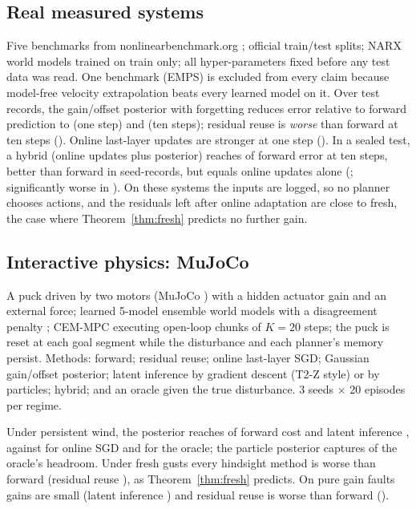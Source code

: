 \documentclass[11pt]{article}
\begin{document}
\subsection{Real measured systems}
Five benchmarks from nonlinearbenchmark.org \citep{nonlinear_benchmarks}; official train/test splits; NARX world models
trained on train only; all hyper-parameters fixed before any test data was read. One benchmark (EMPS) is excluded from
every claim because model-free velocity extrapolation beats every learned model on it. Over \rdRecords{} test records,
the gain/offset posterior with forgetting reduces error relative to forward prediction to \rdOneStep{} (one step) and
\rdTenStep{} (ten steps); residual reuse is \emph{worse} than forward at ten steps (\rdResidTen). Online last-layer
updates \citep{adajepa_2606_32026} are stronger at one step (\rdSgdOne). In a sealed test, a hybrid (online updates plus
posterior) reaches \rdHybridFwd{} of forward error at ten steps, better than forward in \rdHybridSigFwd{} seed-records, but
equals online updates alone (\rdHybridSgd; significantly worse in \rdHybridWorseSgd). On these systems the inputs are
logged, so no planner chooses actions, and the residuals left after online adaptation are close to fresh, the case where
Theorem~\ref{thm:fresh} predicts no further gain.

\subsection{Interactive physics: MuJoCo}
A puck driven by two motors (MuJoCo \citep{todorov2012mujoco}) with a hidden actuator gain and an external force; learned
5-model ensemble world models with a disagreement penalty \citep{chua2018pets}; CEM-MPC executing open-loop chunks of
$K=20$ steps; the puck is reset at each goal segment while the disturbance and each planner's memory persist. Methods:
forward; residual reuse; online last-layer SGD; Gaussian gain/offset posterior; latent inference by gradient descent
(T2-Z style) or by particles; hybrid; and an oracle given the true disturbance. 3 seeds $\times$ 20 episodes per regime.

\begin{table}[h]\centering\scriptsize

\caption{Cost relative to forward planning (lower is better). $\downarrow$/$\uparrow$: 95\% paired-bootstrap interval
entirely below/above 1.}\label{tab:mujoco}
\end{table}

Under persistent wind, the posterior reaches \mjPostWind{} of forward cost and latent inference \mjLatentWind, against
\mjSgdWind{} for online SGD and \mjOracleWind{} for the oracle; the particle posterior captures \mjCaptureWind{} of the
oracle's headroom. Under fresh gusts every hindsight method is worse than forward (residual reuse \mjFreshResid), as
Theorem~\ref{thm:fresh} predicts. On pure gain faults gains are small (latent inference \mjGainLatent) and residual reuse
is worse than forward (\mjGainResid).
\end{document}
